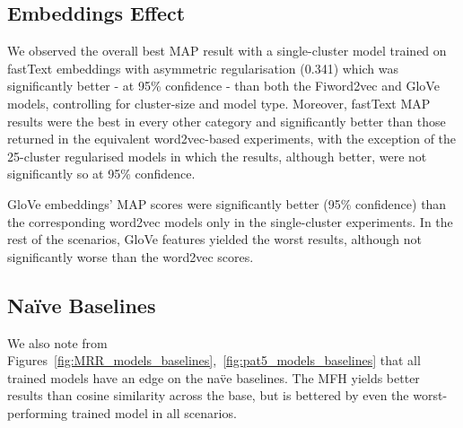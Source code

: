 \subsection{Embeddings Effect} \label{ustalov_embeddings}
We observed the overall best \ac{MAP} result with a single-cluster model trained on fastText embeddings with asymmetric regularisation (0.341) which was significantly better - at 95\% confidence - than both the Fiword2vec and GloVe models, controlling for cluster-size and model type.  Moreover, fastText \ac{MAP} results were the best in every other category and significantly better than those returned in the equivalent word2vec-based experiments, with the exception of the 25-cluster regularised models in which the results, although better, were not significantly so at 95\% confidence.

GloVe embeddings' \ac{MAP} scores were significantly better (95\% confidence) than the corresponding word2vec models only in the single-cluster experiments.  In the rest of the scenarios, GloVe features yielded the worst results, although not significantly worse than the word2vec scores. 

\subsection{Naïve Baselines}
We also note from Figures~\ref{fig:MRR_models_baselines},~\ref{fig:pat5_models_baselines} that all trained models have an edge on the na\"ve baselines.  The \ac{MFH} yields better results than cosine similarity across the base, but is bettered by even the worst-performing trained model in all scenarios.

